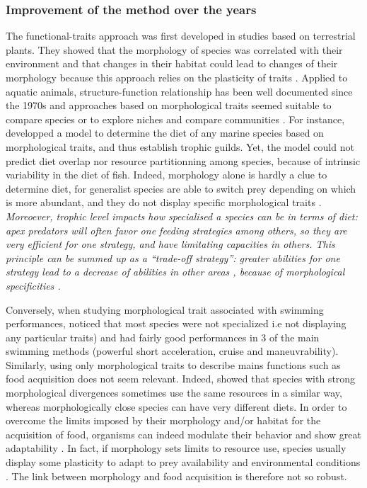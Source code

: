 \subsubsection{Improvement of the method over the years}
The functional-traits approach was first developed in studies based on terrestrial plants. They showed that the morphology of species was correlated with their environment and that changes in their habitat could lead to changes of their morphology because this approach relies on the plasticity of traits \citep{boissezon2014,lavorel1997,martini2020}. Applied to aquatic animals, structure-function relationship has been well documented since the 1970s \citep{gosline1971, lagler1977, webb1984} and approaches based on morphological traits  seemed suitable to compare species \citep{norton1995} or to explore niches and compare communities \citep{winemiller1991}. For instance, \citet{albouy2011} developped a model to determine the diet of any marine species based on morphological traits, and thus establish trophic guilds. Yet, the model could not predict diet overlap nor resource partitionning among species, because of intrinsic variability in the diet of fish. Indeed, morphology alone is hardly a clue to determine diet, for generalist species are able to switch prey depending on which  is more abundant, and they do not display specific morphological traits \citep{sibbing2000}. \emph{Moreoever, trophic level impacts how specialised a species can be in terms of diet: apex predators will often favor one feeding strategies among others, so they are very efficient for one strategy, and have limitating capacities in others. This principle can be summed up as a ``trade-off strategy'': greater abilities for one strategy lead to a decrease of abilities in other areas \citet{norton1995}, because of morphological specificities \citep{nagelkerke2018}.}

Conversely, when studying morphological trait associated with swimming performances, \citet{webb1984} noticed that most species were not specialized i.e not displaying any particular traits) and had fairly good performances in 3 of the main swimming methods (powerful short acceleration, cruise and maneuvrability). Similarly, using only morphological traits to describe mains functions such as food acquisition does not seem relevant. Indeed, \citet{grossman2009} showed that species with strong morphological divergences sometimes use the same resources in a similar way, whereas morphologically close species can have very different diets. In order to overcome the limits imposed by their morphology and/or habitat for the acquisition of food, organisms can indeed modulate their behavior and show great adaptability \citep{blondel1979,grossman2009}. In fact, if morphology sets limits to resource use, species usually display some plasticity to adapt to prey availability and environmental conditions \citep{ibanez2007,sibbing2000}. The link between morphology and food acquisition is therefore not so robust.

